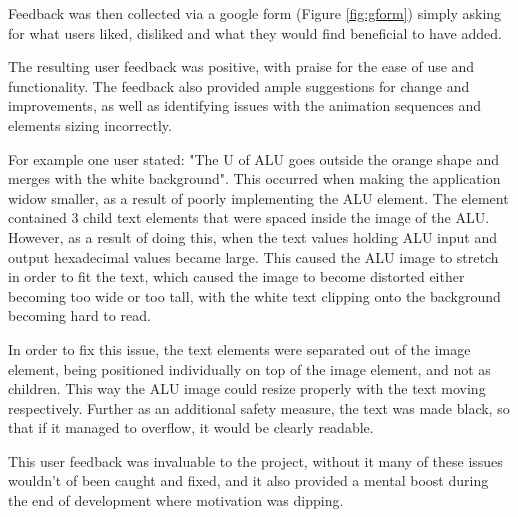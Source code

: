 Feedback was then collected via a google form (Figure \ref{fig:gform}) simply asking for what users liked, disliked and what they would find beneficial to have added.

The resulting user feedback was positive, with praise for the ease of use and functionality. The feedback also provided ample suggestions for change and improvements, as well as identifying issues with the animation sequences and elements sizing incorrectly.

For example one user stated: "The U of ALU goes outside the orange shape and merges with the white background". This occurred when making the application widow smaller, as a result of poorly implementing the \ac{ALU} element. The element contained 3 child text elements that were spaced inside the image of the \ac{ALU}. However, as a result of doing this, when the text values holding \ac{ALU} input and output hexadecimal values became large. This caused the \ac{ALU} image to stretch in order to fit the text, which caused the image to become distorted either becoming too wide or too tall, with the white text clipping onto the background becoming hard to read.

In order to fix this issue, the text elements were separated out of the image element, being positioned individually on top of the image element, and not as children. This way the \ac{ALU} image could resize properly with the text moving respectively. Further as an additional safety measure, the text was made black, so that if it managed to overflow, it would be clearly readable.

This user feedback was invaluable to the project, without it many of these issues wouldn't of been caught and fixed, and it also provided a mental boost during the end of development where motivation was dipping.

